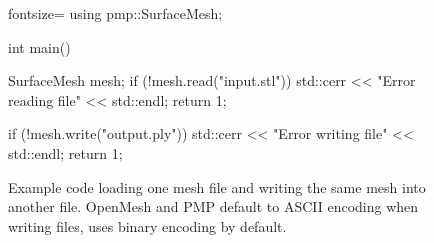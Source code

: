 \begin{figure}[p]
\begin{minipage}{.9\textwidth}
\begin{cppcode*}{fontsize=\footnotesize}
      using pmp::SurfaceMesh;

      int main() {
          SurfaceMesh mesh;
          if (!mesh.read("input.stl")) {
              std::cerr << "Error reading file" << std::endl;
              return 1;
          }

          if (!mesh.write("output.ply")) {
              std::cerr << "Error writing file" << std::endl;
              return 1;
          }
      }
    \end{cppcode*}
  \end{minipage}

  \caption{
    Example code loading one mesh file and writing the same mesh into another file.
    OpenMesh and PMP default to ASCII encoding when writing files,  uses binary encoding by default.
  }
\end{figure}

